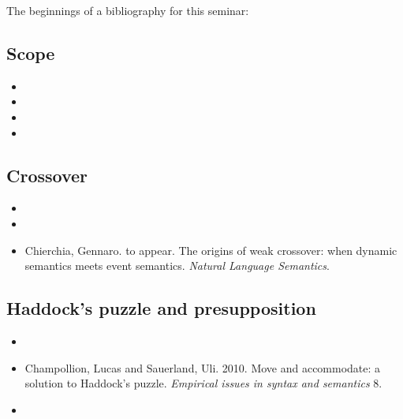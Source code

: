 \documentclass[nols,twoside,nofonts,nobib,nohyper]{tufte-handout}
\begin{document}
The beginnings of a bibliography for this seminar:

\subsection{Scope}

\begin{itemize}

\item {}

\item {}

\item {}

\item {}

\end{itemize}

\subsection{Crossover}

\begin{itemize}

    \item {}

  \item {}

  \item Chierchia, Gennaro. to appear. The origins of weak crossover: when dynamic semantics meets event semantics. \textit{Natural Language Semantics}.

\end{itemize}

\subsection{Haddock's puzzle and presupposition}

\begin{itemize}

    \item {}

    \item Champollion, Lucas and Sauerland, Uli. 2010. Move and accommodate: a solution to Haddock’s puzzle. \textit{Empirical issues in syntax and semantics} 8.

    \item {}

\end{itemize}

\end{document}

